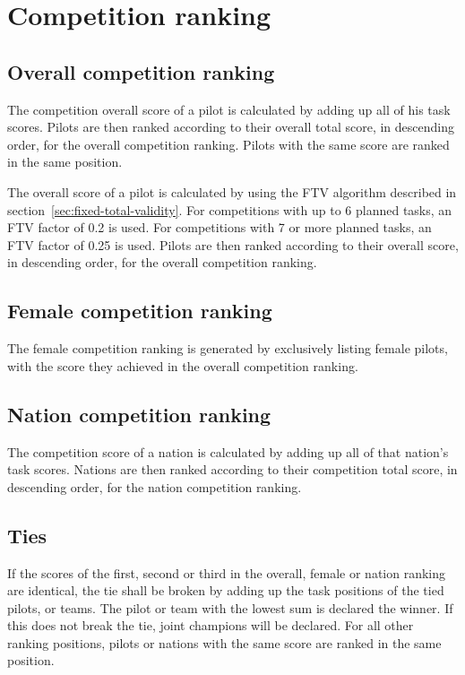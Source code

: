 \documentclass{article}
\begin{document}
\newpage
\section{Competition ranking}
\label{sec:competition-ranking}
\subsection{Overall competition ranking}
\begin{hg}
The competition overall score of a pilot is calculated by adding up all of his
task scores. Pilots are then ranked according to their overall total score, in
descending order, for the overall competition ranking. Pilots with the same
score are ranked in the same position.
\end{hg}

\begin{pg}
The overall score of a pilot is calculated by using the FTV algorithm described
in section~\ref{sec:fixed-total-validity}. For competitions with up to
6 planned tasks, an FTV factor of 0.2 is used. For competitions with 7 or more
planned tasks, an FTV factor of 0.25 is used. Pilots are then ranked according
to their overall score, in descending order, for the overall competition
ranking.\footnotemark
\end{pg}

\subsection{Female competition ranking}
The female competition ranking is generated by exclusively listing female
pilots, with the score they achieved in the overall competition ranking.

\subsection{Nation competition ranking}
The competition score of a nation is calculated by adding up all of that
nation’s task scores. Nations are then ranked according to their competition
total score, in descending order, for the nation competition ranking.

\subsection{Ties}
If the scores of the first, second or third in the overall, female or nation
ranking are identical, the tie shall be broken by adding up the task positions
of the tied pilots, or teams. The pilot or team with the lowest sum is declared
the winner. If this does not break the tie, joint champions will be declared.
For all other ranking positions, pilots or nations with the same score are
ranked in the same position.
\end{document}
